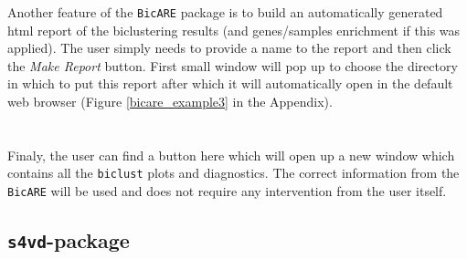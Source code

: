 \documentclass[a4paper]{article}\usepackage[]{graphicx}\usepackage[]{color}
\begin{document}
Another feature of the \verb|BicARE| package is to build an automatically
generated html report of the biclustering results (and genes/samples enrichment
if this was applied). The user simply needs to provide a name to the report and
then click the {\it Make Report} button. First small window will pop up to
choose the directory in which to put this report after which it will
automatically open in the default web browser (Figure \ref{bicare_example3} in the Appendix).
\\ \\
\\
Finaly, the user can find a button here which will open up a new window which
contains all the \verb|biclust| plots and diagnostics. The correct information
from the \verb|BicARE| will be used and does not require any intervention from
the user itself.

\subsection{\texttt{s4vd}-package}
\end{document}
